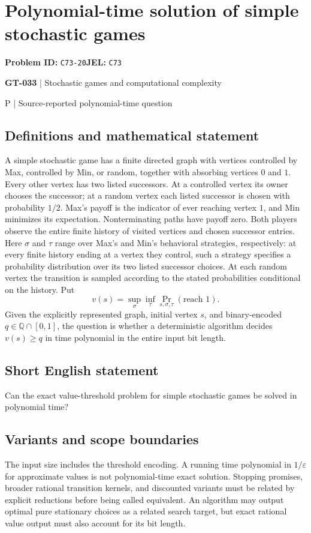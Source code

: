 \documentclass[11pt,a4paper]{article}
\begin{document}
\section*{Polynomial-time solution of simple stochastic games}
\textbf{Problem ID:} \texttt{C73-20}\quad \textbf{JEL:} \texttt{C73}\par
\label{problem:OP-0163}
\label{game:GT-033}
{\sffamily\small\color{muted}
{\sffamily\small\color{muted}\textbf{GT-033} | Stochastic games and computational complexity\par P | Source-reported polynomial-time question\par}
\par}
\subsection*{Definitions and mathematical statement}
A simple stochastic game has a finite directed graph with vertices controlled by Max, controlled by Min, or random, together with absorbing vertices $0$ and $1$. Every other vertex has two listed successors. At a controlled vertex its owner chooses the successor; at a random vertex each listed successor is chosen with probability $1/2$. Max's payoff is the indicator of ever reaching vertex $1$, and Min minimizes its expectation. Nonterminating paths have payoff zero. Both players observe the entire finite history of visited vertices and chosen successor entries. Here $\sigma$ and $\tau$ range over Max's and Min's behavioral strategies, respectively: at every finite history ending at a vertex they control, such a strategy specifies a probability distribution over its two listed successor choices. At each random vertex the transition is sampled according to the stated probabilities conditional on the history. Put
\[
 v(s)=\sup_{\sigma}\inf_{\tau}\Pr_{s,\sigma,\tau}(\text{reach }1).
\]
Given the explicitly represented graph, initial vertex $s$, and binary-encoded $q\in\mathbb Q\cap[0,1]$, the question is whether a deterministic algorithm decides $v(s)\geq q$ in time polynomial in the entire input bit length.
\subsection*{Short English statement}
Can the exact value-threshold problem for simple stochastic games be solved in polynomial time?
\subsection*{Variants and scope boundaries}
The input size includes the threshold encoding. A running time polynomial in $1/\varepsilon$ for approximate values is not polynomial-time exact solution. Stopping promises, broader rational transition kernels, and discounted variants must be related by explicit reductions before being called equivalent. An algorithm may output optimal pure stationary choices as a related search target, but exact rational value output must also account for its bit length.
\end{document}
